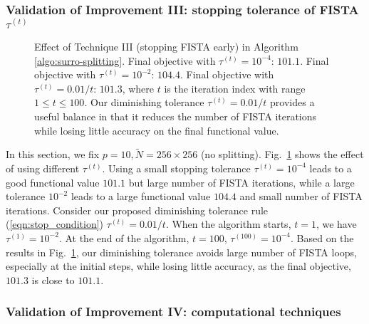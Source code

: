 \documentclass[final]{siamart1116}
\newcommand{\fig}[1]{Fig.~\ref{fig:#1}}
\begin{document}
\subsubsection{Validation of Improvement III: stopping tolerance of FISTA $\tau^{(t)}$}
\label{sec:fix-vs-diminish}

\begin{figure}[t]
\centering

\caption{Effect of Technique III (stopping FISTA early) in Algorithm \ref{algo:surro-splitting}. Final objective with $\tau^{(t)}=10^{-4}$: $101.1$. Final objective with $\tau^{(t)}=10^{-2}$: $104.4$. Final objective with $\tau^{(t)}=0.01/t$: $101.3$, where $t$ is the iteration index with range $1\leq t \leq 100$. Our diminishing tolerance $\tau^{(t)} = 0.01/t$ provides a useful balance in that it reduces the number of FISTA iterations while losing little accuracy on the final functional value.
}
\label{fig:fix_vs_tol}
\end{figure}


In this section, we fix $p=10, \tilde{N} = 256\times256$ (no splitting).
\fig{fix_vs_tol} shows the effect of using different $\tau^{(t)}$. Using a small stopping tolerance $\tau^{(t)}=10^{-4}$ leads to a good functional value $101.1$ but large number of FISTA iterations, while a large tolerance $10^{-2}$ leads to a large functional value $104.4$ and small number of FISTA iterations. Consider our proposed diminishing tolerance rule (\ref{eqn:stop_condition}) $\tau^{(t)} = 0.01/t$. When the algorithm starts, $t=1$, we have $\tau^{(1)} = 10^{-2}$. At the end of the algorithm, $t=100$, $\tau^{(100)} = 10^{-4}$. Based on the results in \fig{fix_vs_tol}, our diminishing tolerance avoids large number of FISTA loops, especially at the initial steps, while losing little accuracy, as the final objective, $101.3$ is close to $101.1$.



\subsubsection{Validation of Improvement IV: computational techniques}
\label{sec:acc}
\end{document}

